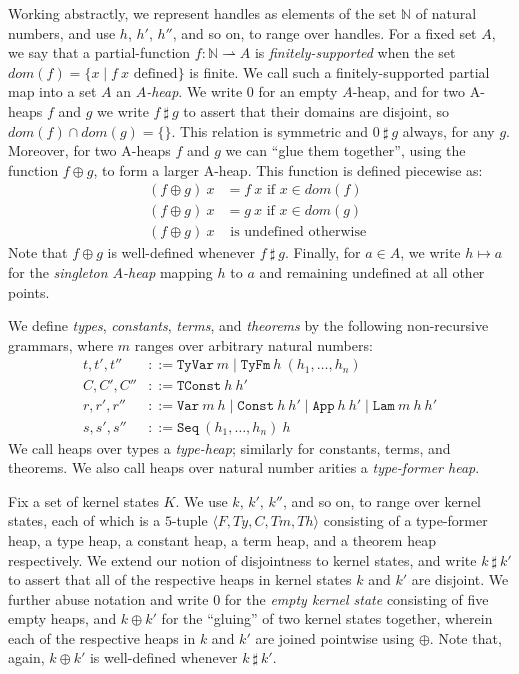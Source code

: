 \documentclass[a4paper, UKenglish, cleveref, autoref, thm-restate, colorlinks]{lipics-v2021}
\begin{document}
Working abstractly, we represent handles as elements of the set $\mathbb{N}$ of natural numbers, and use $h$, $h'$, $h''$, and so on, to range over handles.
For a fixed set $A$, we say that a partial-function $f : \mathbb{N} \rightharpoonup A$ is \emph{finitely-supported} when the set $dom(f) = \{ x \mid f\ x \text{ defined} \}$ is finite.
We call such a finitely-supported partial map into a set $A$ an \emph{$A$-heap}.
We write $0$ for an empty $A$-heap, and for two A-heaps $f$ and $g$ we write $f\ \sharp\ g$ to assert that their domains are disjoint, so $dom(f) \cap dom(g) = \{ \}$.
This relation is symmetric and $0\ \sharp\ g$ always, for any $g$.
Moreover, for two A-heaps $f$ and $g$ we can ``glue them together'', using the function $f \oplus g$, to form a larger A-heap.
This function is defined piecewise as:
\begin{align*}
(f \oplus g)\ x & = f\ x \text{ if $x \in dom(f)$ } \\
(f \oplus g)\ x & = g\ x \text{ if $x \in dom(g)$ } \\
(f \oplus g)\ x & \text{ is undefined otherwise }
\end{align*}
Note that $f \oplus g$ is well-defined whenever $f\ \sharp\ g$.
Finally, for $a \in A$, we write $h \mapsto a$ for the \emph{singleton $A$-heap} mapping $h$ to $a$ and remaining undefined at all other points.

We define \emph{types}, \emph{constants}, \emph{terms}, and \emph{theorems} by the following non-recursive grammars, where $m$ ranges over arbitrary natural numbers:
\begin{align*}
t, t', t'' &::= \mathtt{TyVar}\ m \mid \mathtt{TyFm}\ h\ (h_1, \ldots, h_n) \\
C, C', C'' &::= \mathtt{TConst}\ h\ h' \\
r, r', r'' &::= \mathtt{Var}\ m\ h \mid \mathtt{Const}\ h\ h' \mid \mathtt{App}\ h\ h' \mid \mathtt{Lam}\ m\ h\ h' \\
s, s', s'' &::= \mathtt{Seq}\ (h_1, \ldots, h_n)\ h
\end{align*}
We call heaps over types a \emph{type-heap}; similarly for constants, terms, and theorems.
We also call heaps over natural number arities a \emph{type-former heap}.

Fix a set of kernel states $K$.
We use $k$, $k'$, $k''$, and so on, to range over kernel states, each of which is a $5$-tuple $\langle F, Ty, C, Tm, Th \rangle$ consisting of a type-former heap, a type heap, a constant heap, a term heap, and a theorem heap respectively.
We extend our notion of disjointness to kernel states, and write $k\ \sharp\ k'$ to assert that all of the respective heaps in kernel states $k$ and $k'$ are disjoint.
We further abuse notation and write $0$ for the \emph{empty kernel state} consisting of five empty heaps, and $k \oplus k'$ for the ``gluing'' of two kernel states together, wherein each of the respective heaps in $k$ and $k'$ are joined pointwise using $\oplus$.
Note that, again, $k \oplus k'$ is well-defined whenever $k\ \sharp\ k'$.
\end{document}
